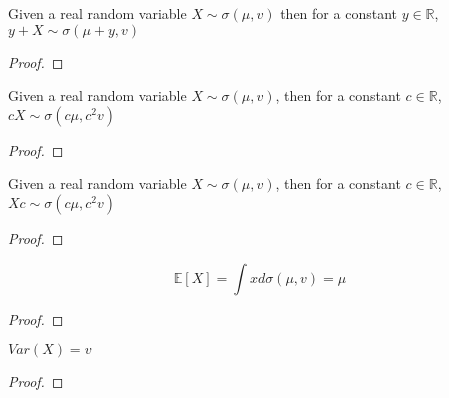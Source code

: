 \begin{lemma}\label{lem:semicircleReal_const_add}
  \mathlibok
  Given a real random variable $X \sim \sigma(\mu, v)$
  then for a constant $y \in \mathbb{R}$, $y + X \sim \sigma(\mu + y, v)$
  \begin{proof}

  \end{proof}
\end{lemma}


\begin{lemma}\label{lem:semicircleReal_const_mul}
  \mathlibok
  Given a real random variable $X \sim \sigma(\mu, v)$,
  then for a constant $c \in \mathbb{R}$, $cX \sim \sigma(c\mu , c^2v)$
  \begin{proof}

  \end{proof}
\end{lemma}


\begin{lemma}\label{lem:semicircleReal_mul_const}
  \mathlibok
   Given a real random variable $X \sim \sigma(\mu, v)$,
  then for a constant $c \in \mathbb{R}$, $Xc \sim \sigma(c \mu  , c^2v)$
  \begin{proof}

  \end{proof}
\end{lemma}








\begin{lemma}\label{lem:integral_id_semicircleReal}
  \notready
  $$\mathbb{E}[X] = \int x d \sigma(\mu, v) = \mu$$
  \begin{proof}
  \end{proof}
\end{lemma}

\begin{lemma}\label{lem:variance_fun_id_semicircleReal}
  \notready
  $Var(X) = v$
  \begin{proof}
  \end{proof}
\end{lemma}


